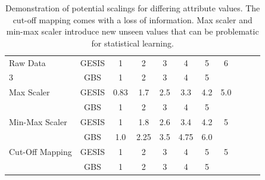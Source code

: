 \begin{table}[ht]
    \begin{center}
	\captionsetup{width= 400pt}
            {\footnotesize
            \begin{tabular}{l|c|ccccccccc}
                \hline \hline
		Raw Data & GESIS & 1 & 2 & 3 & 4 & 5 & 6 \\3
                     & GBS & 1 & 2 & 3 & 4 & 5 & \\
                \hline
		Max Scaler & GESIS & 0.83 & 1.7 & 2.5 & 3.3 & 4.2 & 5.0 \\
                     & GBS & 1 & 2 & 3 & 4 & 5 & \\
                \hline
		Min-Max Scaler & GESIS & 1 & 1.8 & 2.6 & 3.4 & 4.2 & 5 \\
                     & GBS & 1.0 & 2.25 & 3.5 & 4.75 & 6.0 & \\
                \hline
		Cut-Off Mapping & GESIS & 1 & 2 & 3 & 4 & 5 & 5 \\
                     & GBS & 1 & 2 & 3 & 4 & 5 & \\
	     \hline \hline
            \end{tabular}}
        \caption{Demonstration of potential scalings for differing attribute values. The cut-off mapping comes with a loss of information. Max scaler and min-max scaler introduce new unseen values that can be problematic for statistical learning.}
\label{Tab:DescripStatsRawData}
\end{center}
\end{table}

